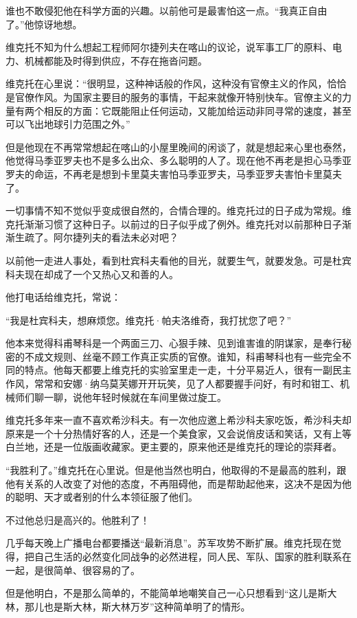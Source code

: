 谁也不敢侵犯他在科学方面的兴趣。以前他可是最害怕这一点。“我真正自由了。”他惊讶地想。

维克托不知为什么想起工程师阿尔捷列夫在喀山的议论，说军事工厂的原料、电力、机械都能及时得到供应，不存在拖沓问题。

维克托在心里说：“很明显，这种神话般的作风，这种没有官僚主义的作风，恰恰是官僚作风。为国家主要目的服务的事情，干起来就像开特别快车。官僚主义的力量有两个相反的方面：它既能阻止任何运动，又能加给运动非同寻常的速度，甚至可以飞出地球引力范围之外。”

但是他现在不再常常想起在喀山的小屋里晚间的闲谈了，就是想起来心里也泰然，他觉得马季亚罗夫也不是多么出众、多么聪明的人了。现在他不再老是担心马季亚罗夫的命运，不再老是想到卡里莫夫害怕马季亚罗夫，马季亚罗夫害怕卡里莫夫了。

一切事情不知不觉似乎变成很自然的，合情合理的。维克托过的日子成为常规。维克托渐渐习惯了这种日子。以前过的日子似乎成了例外。维克托对以前那种日子渐渐生疏了。阿尔捷列夫的看法未必对吧？

以前他一走进人事处，看到杜宾科夫看他的目光，就要生气，就要发急。可是杜宾科夫现在却成了一个又热心又和善的人。

他打电话给维克托，常说：

“我是杜宾科夫，想麻烦您。维克托·帕夫洛维奇，我打扰您了吧？”

他本来觉得科甫琴科是一个两面三刀、心狠手辣、见到谁害谁的阴谋家，是奉行秘密的不成文规则、丝毫不顾工作真正实质的官僚。谁知，科甫琴科也有一些完全不同的特点。他每天都要上维克托的实验室里走一走，十分平易近人，很有一副民主作风，常常和安娜·纳乌莫芙娜开开玩笑，见了人都要握手问好，有时和钳工、机械师们聊一聊，说他年轻时候就在车间里做过旋工。

维克托多年来一直不喜欢希沙科夫。有一次他应邀上希沙科夫家吃饭，希沙科夫却原来是一个十分热情好客的人，还是一个美食家，又会说俏皮话和笑话，又有上等白兰地，还是一位版画收藏家。更主要的，原来他还是维克托的理论的崇拜者。

“我胜利了。”维克托在心里说。但是他当然也明白，他取得的不是最高的胜利，跟他有关系的人改变了对他的态度，不再阻碍他，而是帮助起他来，这决不是因为他的聪明、天才或者别的什么本领征服了他们。

不过他总归是高兴的。他胜利了！

几乎每天晚上广播电台都要播送“最新消息”。苏军攻势不断扩展。维克托现在觉得，把自己生活的必然变化同战争的必然进程，同人民、军队、国家的胜利联系在一起，是很简单、很容易的了。

但是他明白，不是那么简单的，不能简单地嘲笑自己一心只想看到“这儿是斯大林，那儿也是斯大林，斯大林万岁”这种简单明了的情形。

